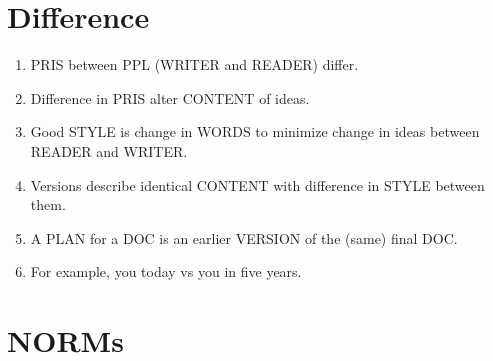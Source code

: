 \documentclass[
]{book}
\providecommand{\tightlist}{%
  \setlength{\itemsep}{0pt}\setlength{\parskip}{0pt}}
\begin{document}
\hypertarget{difference}{%
\section{Difference}\label{difference}}

\begin{enumerate}
\def\labelenumi{\arabic{enumi}.}
\setcounter{enumi}{27}
\tightlist
\item
  PRIS between PPL (WRITER and READER) differ.
\item
  Difference in PRIS alter CONTENT of ideas.
\item
  Good STYLE is change in WORDS to minimize change in ideas between
  READER and WRITER.
\item
  Versions describe identical CONTENT with difference in STYLE between
  them.
\item
  A PLAN for a DOC is an earlier VERSION of the (same) final DOC.
\item
  For example, you today vs you in five years.
\end{enumerate}

\hypertarget{norms}{%
\section{NORMs}\label{norms}}
\end{document}
